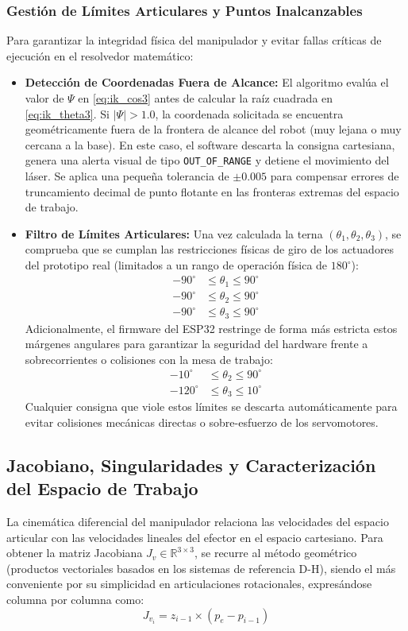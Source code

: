 \documentclass[conference,a4paper]{IEEEtran}
\begin{document}
\subsubsection{Gestión de Límites Articulares y Puntos Inalcanzables}
Para garantizar la integridad física del manipulador y evitar fallas críticas de ejecución en el resolvedor matemático:
\begin{itemize}
    \item \textbf{Detección de Coordenadas Fuera de Alcance:} El algoritmo evalúa el valor de $\Psi$ en \eqref{eq:ik_cos3} antes de calcular la raíz cuadrada en \eqref{eq:ik_theta3}. Si $|\Psi| > 1.0$, la coordenada solicitada se encuentra geométricamente fuera de la frontera de alcance del robot (muy lejana o muy cercana a la base). En este caso, el software descarta la consigna cartesiana, genera una alerta visual de tipo \texttt{OUT\_OF\_RANGE} y detiene el movimiento del láser. Se aplica una pequeña tolerancia de $\pm 0.005$ para compensar errores de truncamiento decimal de punto flotante en las fronteras extremas del espacio de trabajo.
    \item \textbf{Filtro de Límites Articulares:} Una vez calculada la terna $(\theta_1, \theta_2, \theta_3)$, se comprueba que se cumplan las restricciones físicas de giro de los actuadores del prototipo real (limitados a un rango de operación física de $180^\circ$):
    \begin{align}
    -90^\circ &\le \theta_1 \le 90^\circ \\
    -90^\circ &\le \theta_2 \le 90^\circ \\
    -90^\circ &\le \theta_3 \le 90^\circ
    \end{align}
    Adicionalmente, el firmware del ESP32 restringe de forma más estricta estos márgenes angulares para garantizar la seguridad del hardware frente a sobrecorrientes o colisiones con la mesa de trabajo:
    \begin{align}
    -10^\circ &\le \theta_{2} \le 90^\circ \\
    -120^\circ &\le \theta_{3} \le 10^\circ
    \end{align}
    Cualquier consigna que viole estos límites se descarta automáticamente para evitar colisiones mecánicas directas o sobre-esfuerzo de los servomotores.
\end{itemize}

\subsection{Jacobiano, Singularidades y Caracterización del Espacio de Trabajo}
La cinemática diferencial del manipulador relaciona las velocidades del espacio articular con las velocidades lineales del efector en el espacio cartesiano. Para obtener la matriz Jacobiana $J_v \in \mathbb{R}^{3 \times 3}$, se recurre al método geométrico (productos vectoriales basados en los sistemas de referencia D-H), siendo el más conveniente por su simplicidad en articulaciones rotacionales, expresándose columna por columna como:
\begin{equation}
J_{v_i} = z_{i-1} \times (p_e - p_{i-1})
\end{equation}
\end{document}
